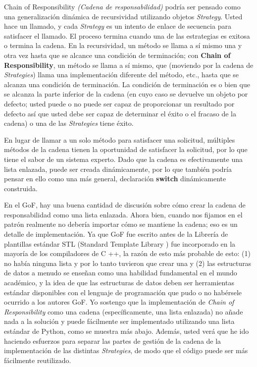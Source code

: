 Chain of Responsibility \textit{(Cadena de responsabilidad)} podría ser pensado como una generalización dinámica de recursividad utilizando objetos \textit{Strategy}. Usted hace un llamado, y cada \textit{Strategy} es un intento de enlace de secuencia para satisfacer el llamado. El proceso termina cuando una de las estrategias es exitosa o termina la cadena. En la recursividad, un método se llama a sí mismo una y otra vez hasta que se alcance una condición de terminación; con \textbf{Chain of Responsibility}, un método se llama a sí mismo, que (moviendo por la cadena de \textit{Strategies}) llama una implementación diferente del método, etc., hasta que se alcanza una condición de terminación. La condición de terminación es o bien que se alcanza la parte inferior de la cadena (en cuyo caso se devuelve un objeto por defecto; usted puede o no puede ser capaz de proporcionar un resultado por defecto así que usted debe ser capaz de determinar el éxito o el fracaso de la cadena) o una de las \textit{Strategies} tiene éxito.      \newline

En lugar de llamar a un solo método para satisfacer una solicitud, múltiples métodos de la cadena tienen la oportunidad de satisfacer la solicitud, por lo que tiene el sabor de un sistema experto. Dado que la cadena es efectivamente una lista enlazada, puede ser creada dinámicamente, por lo que también podría pensar en ello como una más general, declaración \textbf{switch} dinámicamente construida.   \newline

En el GoF, hay una buena cantidad de discusión sobre cómo crear la cadena de responsabilidad como una lista enlazada. Ahora bien, cuando nos fijamos en el patrón realmente no debería importar cómo se mantiene la cadena; eso es un detalle de implementación. Ya que GoF fue escrito antes de la Librería de plantillas estándar STL (Standard Template Library ) fue incorporado en la mayoría de los compiladores de C ++, la razón de esto más probable de esto: (1) no había ninguna lista y por lo tanto tuvieron que crear una y (2) las estructuras de datos a menudo se enseñan como una habilidad fundamental en el mundo académico, y la idea de que las estructuras de datos deben ser herramientas estándar disponibles con el lenguaje de programación que pudo o no habérsele ocurrido a los autores GoF. Yo sostengo que la implementación de \textit{Chain of Responsibility} como una cadena  (específicamente, una lista enlazada) no añade nada a la solución y puede fácilmente ser implementado utilizando una lista estándar de Python, como se muestra más abajo. Además, usted verá que he ido haciendo esfuerzos para separar las partes de gestión de la cadena de la implementación de las distintas \textit{Strategies}, de modo que el código puede ser más fácilmente reutilizado.    \newline


